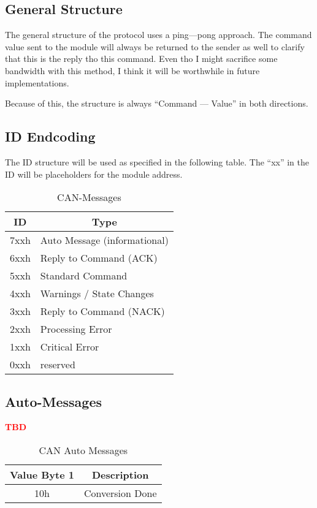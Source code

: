 \newpage

\subsection{General Structure}
The general structure of the protocol uses a ping---pong approach. The command value sent to the module will always be returned to the sender as well to clarify that this is the reply tho this command. Even tho I might sacrifice some bandwidth with this method, I think it will be worthwhile in future implementations. 

Because of this, the structure is always ``Command --- Value'' in both directions.

\subsection{ID Endcoding}
The ID structure will be used as specified in the following table. The ``xx'' in the ID will be placeholders for the module address. 

\begin{table}[H]
    \centering
    \begin{tabular}{|c|l|}
        \hline
        \textbf{ID}   &   \multicolumn{1}{|c|}{\textbf{Type}}\\ \hline \hline
        7xxh   &   Auto Message (informational) \\ \hline
        6xxh   &   Reply to Command (ACK)  \\  \hline
        5xxh   &   Standard Command    \\ \hline
        4xxh   &   Warnings / State Changes\\ \hline
        3xxh   &   Reply to Command (NACK) \\  \hline
        2xxh   &   Processing Error    \\ \hline
        1xxh   &   Critical Error      \\ \hline
        0xxh   &   reserved \\ \hline
    \end{tabular}
    \caption{CAN-Messages}
    \label{tab:CAN-Messages}
\end{table}

\subsection{Auto-Messages}
\textbf{\textcolor[HTML]{FF0000}{TBD}}
\begin{table}[H]
    \centering
    \begin{tabular}{|c|l|}
        \hline
        \textbf{Value Byte 1}   &   \multicolumn{1}{|c|}{\textbf{Description}}\\ \hline \hline
        10h    &   Conversion Done    \\ \hline
    \end{tabular}
    \caption{CAN Auto Messages}
    \label{tab:CAN-Auto}
\end{table}

